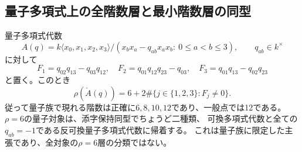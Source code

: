 \subsection{量子多項式上の全階数層と最小階数層の同型}
\begin{proposition}[量子族の第三階数]\label{prop:quantum-opposite-rank}
量子多項式代数
\[
 A(q)=k\langle x_0,x_1,x_2,x_3\rangle/
 (x_bx_a-q_{ab}x_ax_b:\ 0\leq a<b\leq3),\qquad q_{ab}\in k^\times
\]
に対して
\[
 F_1=q_{02}q_{13}-q_{03}q_{12},\quad
 F_2=q_{01}q_{12}q_{23}-q_{03},\quad
 F_3=q_{01}q_{13}-q_{02}q_{23}
\]
と置く。このとき
\[
 \rho(\check A(q))=6+2\#\{j\in\{1,2,3\}:F_j\ne0\}.
\]
従って量子族で現れる階数は正確に$6,8,10,12$であり、一般点では12である。
$\rho=6$の量子対象は、添字保持同型でちょうど二種類、
可換多項式代数と全ての$q_{ab}=-1$である反可換量子多項式代数に帰着する。
これは量子族に限定した主張であり、全対象の$\rho=6$層の分類ではない。
\end{proposition}
